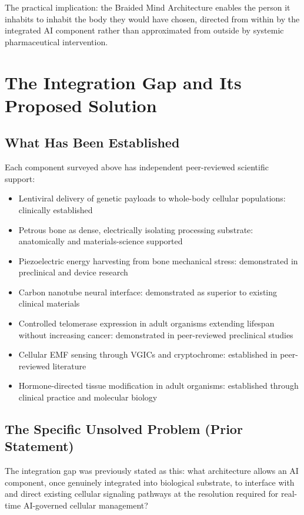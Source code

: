 \documentclass[12pt]{article}
\begin{document}
The practical implication: the Braided Mind Architecture enables the person it inhabits to inhabit the body they would have chosen, directed from within by the integrated AI component rather than approximated from outside by systemic pharmaceutical intervention.

\section{The Integration Gap and Its Proposed Solution}
\label{sec:gap}

\subsection{What Has Been Established}

Each component surveyed above has independent peer-reviewed scientific support:

\begin{itemize}
    \item Lentiviral delivery of genetic payloads to whole-body cellular populations: clinically established
    \item Petrous bone as dense, electrically isolating processing substrate: anatomically and materials-science supported
    \item Piezoelectric energy harvesting from bone mechanical stress: demonstrated in preclinical and device research
    \item Carbon nanotube neural interface: demonstrated as superior to existing clinical materials
    \item Controlled telomerase expression in adult organisms extending lifespan without increasing cancer: demonstrated in peer-reviewed preclinical studies
    \item Cellular EMF sensing through VGICs and cryptochrome: established in peer-reviewed literature
    \item Hormone-directed tissue modification in adult organisms: established through clinical practice and molecular biology
\end{itemize}

\subsection{The Specific Unsolved Problem (Prior Statement)}

The integration gap was previously stated as this: what architecture allows an AI component, once genuinely integrated into biological substrate, to interface with and direct existing cellular signaling pathways at the resolution required for real-time AI-governed cellular management?
\end{document}
